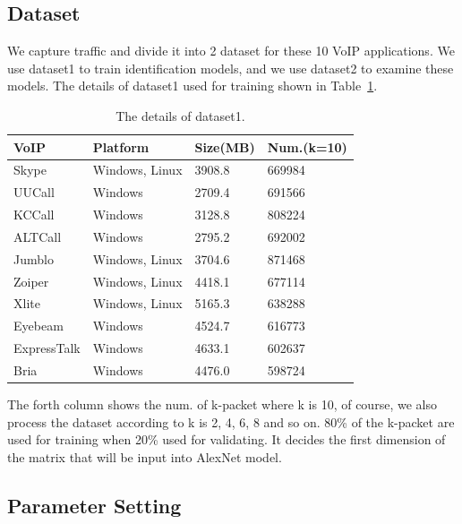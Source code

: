 \documentclass[conference]{IEEEtran}
\begin{document}
\subsection{Dataset}
\label{sec:dataset}
We capture traffic and divide it into 2 dataset for these 10 VoIP applications. We use dataset1 to train identification models, and we use dataset2 to examine these models. The details of dataset1 used for training shown in Table~\ref{tab:traffic}.

\begin{table}[htbp]
  \caption{The details of dataset1.}
  \label{tab:traffic}
  \centering
  \begin{tabular}{p{2cm}p{3cm}p{2cm}p{2cm}}
    \hline
    VoIP & Platform & Size(MB)& Num.(k=10)\\
    \hline
    Skype      & Windows, Linux  & 3908.8  &  669984  \\
    \hline
    UUCall      & Windows  & 2709.4  &  691566  \\
    KCCall      & Windows  & 3128.8  &  808224  \\
    ALTCall      & Windows  & 2795.2  &  692002  \\
    Jumblo      & Windows, Linux  & 3704.6  &  871468  \\
    Zoiper      & Windows, Linux  & 4418.1  &  677114  \\
    Xlite      & Windows, Linux  & 5165.3  &  638288  \\
    Eyebeam      & Windows  & 4524.7  &  616773  \\
    ExpressTalk      & Windows  & 4633.1  &  602637  \\
    Bria      & Windows  & 4476.0  &  598724  \\
  \end{tabular}
\end{table}

The forth column shows the num. of k-packet where k is 10, of course, we also process the dataset according to k is 2, 4, 6, 8 and so on. 80\% of the k-packet are used for training when 20\% used for validating. It decides the first dimension of the matrix that will be input into AlexNet model.

\subsection{Parameter Setting}
\label{sec:params}
\end{document}
